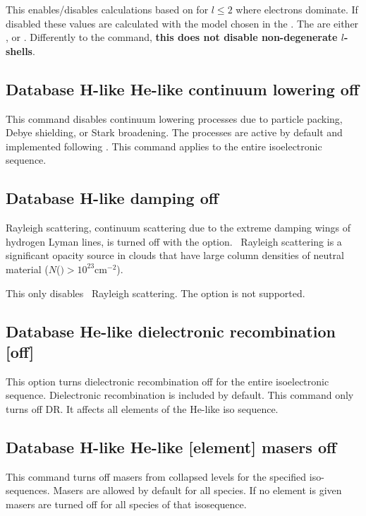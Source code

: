 This enables/disables calculations based on \citet{Seaton1962} for $l\leq 2$ where electrons dominate. 
If disabled these values are calculated with the model chosen in the . 
The  are either ,  or . 
Differently to the  command, {\bf this does not disable non-degenerate $l$-shells}.

\subsection{Database H-like \OR{} He-like  continuum lowering off }
This command disables continuum lowering processes due to particle packing,
Debye shielding, or Stark broadening.  The processes are active by default
and implemented following \citet{Bautista00}.  This command applies
to the entire isoelectronic sequence.

\subsection{Database H-like damping off}

Rayleigh scattering, continuum scattering due to the extreme damping
wings of hydrogen Lyman lines, is turned off with the  option.
\hi\  Rayleigh scattering is a significant opacity source in clouds that have
large column densities of neutral material
($N$(\hO $) > 10^{23} \mathrm{cm}^{-2}$).

This only disables \hi\ Rayleigh scattering.  
The  option is not supported. 

\subsection{Database He-like dielectronic recombination [off] }

This option turns dielectronic recombination off for the entire
isoelectronic sequence.
Dielectronic recombination is included by default.
This command only turns off DR.
It affects all elements of the He-like iso sequence.

\subsection{Database H-like \OR{} He-like [element] masers off }

This command turns off masers from collapsed levels for the specified
iso-sequences. Masers are allowed by default for all species. If no 
element is given masers are turned off for all species of that isosequence.


